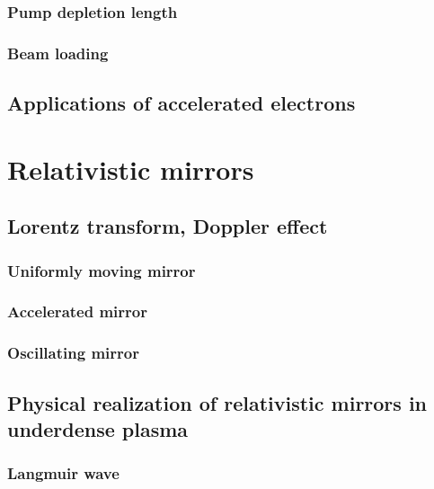 \documentclass[10pt, twoside, a4paper, openright]{report}
\begin{document}
\subsection{Pump depletion length}

\subsection{Beam loading}

\section{Applications of accelerated electrons}
%


\chapter{Relativistic mirrors}
%

\section{Lorentz transform, Doppler effect}
%

\subsection{Uniformly moving mirror}
%

\subsection{Accelerated mirror}
%

\subsection{Oscillating mirror}
%

\section{Physical realization of relativistic mirrors in underdense plasma}
%

\subsection{Langmuir wave}
%
\end{document}
